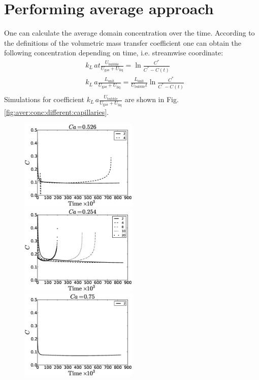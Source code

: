 \documentclass{article}
\newcommand{\beqal}{\begin{equation}\begin{aligned}}
\newcommand{\feqal}{\end{aligned}\end{equation}}
\newcommand{\vol}{k_L\,a}
\newcommand{\lunit}{L_{\mathrm{unit}}}
\newcommand{\ububble}{U_{\mathrm{bubble}}}
\newcommand{\uliq}{U_{\mathrm{liq}}}
\newcommand{\ugas}{U_{\mathrm{gas}}}
\begin{document}
\section{Performing average approach}
One can calculate the average domain concentration over the time. According to the definitions of
the volumetric mass transfer coefficient one can obtain the following concentration depending on
time, i.e. streamwise coordinate:
\beqal
&\vol t \frac{\ububble}{\ugas+\uliq}=\ln\frac{C^*}{C^*-C(t)}\\
&\vol \frac{\lunit}{\ugas+\uliq}=\frac{\lunit}{\ububble t} \ln \frac{C^*}{C^*-C(t)}\\
\feqal
Simulations for coefficient $\vol \frac{\ububble}{\ugas+\uliq}$ are shown in Fig.
\ref{fig:aver:conc:different:capillaries}.
\begin{figure}
\includegraphics[width=0.5\textwidth]{Figures/aver_conc_scale_ca026.eps}
\includegraphics[width=0.5\textwidth]{Figures/aver_conc_scale_ca054.eps}\\
\includegraphics[width=0.5\textwidth]{Figures/aver_conc_scale_ca05.eps}

\end{figure}
\end{document}
